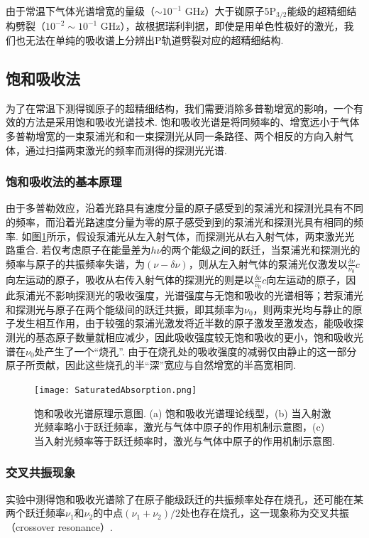 \documentclass[a4paper, 10pt]{article}
\begin{document}
\begin{multicols}{2}
由于常温下气体光谱增宽的量级（$\sim 10^{-1}$ GHz）大于铷原子5P$_{3/2}$能级的超精细结构劈裂（$10^{-2}\sim 10^{-1}$ GHz），故根据瑞利判据，即使是用单色性极好的激光，我们也无法在单纯的吸收谱上分辨出P轨道劈裂对应的超精细结构.

\subsection{饱和吸收法}
为了在常温下测得铷原子的超精细结构，我们需要消除多普勒增宽的影响，一个有效的方法是采用饱和吸收光谱技术. 饱和吸收光谱是将同频率的、增宽远小于气体多普勒增宽的一束泵浦光和和一束探测光从同一条路径、两个相反的方向入射气体，通过扫描两束激光的频率而测得的探测光光谱.

\subsubsection{饱和吸收法的基本原理}
由于多普勒效应，沿着光路具有速度分量的原子感受到的泵浦光和探测光具有不同的频率，而沿着光路速度分量为零的原子感受到到的泵浦光和探测光具有相同的频率. 如图\ref{saturated-absorption}所示，假设泵浦光从左入射气体，而探测光从右入射气体，两束激光光路重合. 若仅考虑原子在能量差为$h\nu$的两个能级之间的跃迁，当泵浦光和探测光的频率与原子的共振频率失谐，为$(\nu-\delta\nu)$，则从左入射气体的泵浦光仅激发以$\frac{\delta\nu}{\nu_0}c$向左运动的原子，吸收从右传入射气体的探测光的则是以$\frac{\delta\nu}{\nu_0}c$向左运动的原子，因此泵浦光不影响探测光的吸收强度，光谱强度与无饱和吸收的光谱相等；若泵浦光和探测光与原子在两个能级间的跃迁共振，即其频率为$\nu_0$，则两束光均与静止的原子发生相互作用，由于较强的泵浦光激发将近半数的原子激发至激发态，能吸收探测光的基态原子数量就相应减少，因此吸收强度较无饱和吸收的更小，饱和吸收光谱在$\nu_0$处产生了一个“烧孔”. 由于在烧孔处的吸收强度的减弱仅由静止的这一部分原子所贡献，因此这些烧孔的半“深”宽应与自然增宽的半高宽相同.

\begin{figure}[H]
    \centering
    \texttt{[image: SaturatedAbsorption.png]}
    \caption{饱和吸收光谱原理示意图. (a) 饱和吸收光谱理论线型，(b) 当入射激光频率略小于跃迁频率，激光与气体中原子的作用机制示意图，(c) 当入射光频率等于跃迁频率时，激光与气体中原子的作用机制示意图.}
    \label{saturated-absorption}
\end{figure}

\subsubsection{交叉共振现象}
实验中测得饱和吸收光谱除了在原子能级跃迁的共振频率处存在烧孔，还可能在某两个跃迁频率$\nu_1$和$\nu_2$的中点$(\nu_1+\nu_2)/2$处也存在烧孔，这一现象称为交叉共振（crossover resonance）.


\end{multicols}
\end{document}
